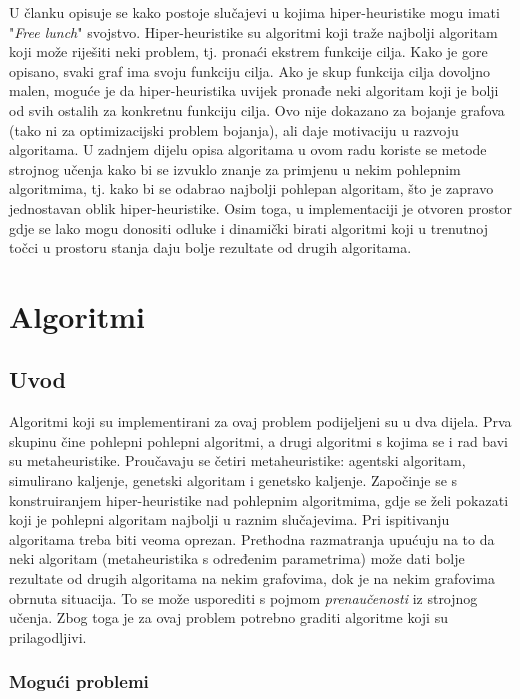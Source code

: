 \documentclass[times, utf8, diplomski, numeric]{fer}
\begin{document}
U članku \cite{lit9} opisuje se kako postoje slučajevi u kojima hiper-heuristike mogu imati "\emph{Free lunch}" svojstvo. Hiper-heuristike su algoritmi koji traže najbolji algoritam koji može riješiti neki problem, tj. pronaći ekstrem funkcije cilja. Kako je gore opisano, svaki graf ima svoju funkciju cilja. Ako je skup funkcija cilja dovoljno malen, moguće je da hiper-heuristika uvijek pronađe neki algoritam koji je bolji od svih ostalih za konkretnu funkciju cilja. Ovo nije dokazano za bojanje grafova (tako ni za optimizacijski problem bojanja), ali daje motivaciju u razvoju algoritama. U zadnjem dijelu opisa algoritama u ovom radu koriste se metode strojnog učenja kako bi se izvuklo znanje za primjenu u nekim pohlepnim algoritmima, tj. kako bi se odabrao najbolji pohlepan algoritam, što je zapravo jednostavan oblik hiper-heuristike. Osim toga, u implementaciji je otvoren prostor gdje se lako mogu donositi odluke i dinamički birati algoritmi koji u trenutnoj točci u prostoru stanja daju bolje rezultate od drugih algoritama.

\chapter{Algoritmi}

\section{Uvod}

Algoritmi koji su implementirani za ovaj problem podijeljeni su u dva dijela. Prva skupinu čine pohlepni pohlepni algoritmi, a drugi algoritmi s kojima se i rad bavi su metaheuristike. Proučavaju se četiri metaheuristike: agentski algoritam, simulirano kaljenje, genetski algoritam i genetsko kaljenje. Započinje se s konstruiranjem hiper-heuristike nad pohlepnim algoritmima, gdje se želi pokazati koji je pohlepni algoritam najbolji u raznim slučajevima. Pri ispitivanju algoritama treba biti veoma oprezan. Prethodna razmatranja upućuju na to da neki algoritam (metaheuristika s određenim parametrima) može dati bolje rezultate od drugih algoritama na nekim grafovima, dok je na nekim grafovima obrnuta situacija. To se može usporediti s pojmom \emph{prenaučenosti} iz strojnog učenja. Zbog toga je za ovaj problem potrebno graditi algoritme koji su prilagodljivi.

\subsection{Mogući problemi}
\end{document}
